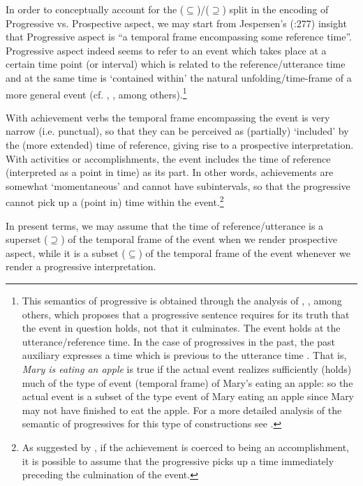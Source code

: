 \documentclass[output=paper,modfonts,nonflat,newtxmath,colorlinks,citecolor=brown]{langsci/langscibook}
\begin{document}
In order to conceptually account for the (${\subseteq}$)/(${\supseteq}$) split in the encoding of Progressive {vs}. Prospective aspect, we may start from Jespersen’s (\citeyear{Jespersen1924}:277) insight that Progressive aspect is “a temporal frame encompassing some reference time”. Progressive aspect indeed seems to refer to an event which takes place at a certain time point (or interval) which is related to the reference/utterance time and at the same time is  ‘contained within’ the natural unfolding/time-frame of a more general event (cf. \citealt{Dowty1979}, \citealt{Higginbotham2004}, among others).\footnote{This semantics of progressive is obtained through the analysis of \citet{Higginbotham2009}, \citet{Parsons1989}, \citet{Landman1992} among others, which proposes that a progressive sentence requires for its truth that the event in question {holds}, not that it {culminates}. The event holds at the utterance/reference time. In the case of progressives in the past, the past auxiliary expresses a time which is previous to the utterance time \citep{Higginbotham2009}. That is, \textit{Mary is eating an apple} is true if the actual event realizes sufficiently (holds) much of the type of event (temporal frame) of {Mary’s eating an apple}: so the actual event is a subset of the type event of {Mary eating an appl}e since Mary may not have finished to eat the apple. For a more detailed analysis of the semantic of progressives for this type of constructions see \citet{ManziniEtAl2017}.}  

With achievement verbs the temporal frame encompassing the event is very narrow (i.e. punctual), so that they can be perceived as (partially) ‘included’ by the (more extended) time of reference, giving rise to a prospective interpretation. With activities or accomplishments, the event includes the time of reference (interpreted as a point in time) as its part. In other words, achievements are somewhat ‘momentaneous’ and cannot have subintervals, so that the progressive cannot pick up a (point in) time within the event.\footnote{As suggested by \citet{Rothstein2004}, if the achievement is coerced to being an accomplishment, it is possible to assume that the progressive picks up a time immediately preceding the culmination of the event.} 

In present terms, we may assume that the time of reference/utterance is a superset (${\supseteq}$) of the temporal frame of the event when we render prospective aspect, while it is a subset (${\subseteq}$) of the temporal frame of the event whenever we render a progressive interpretation.
\end{document}
